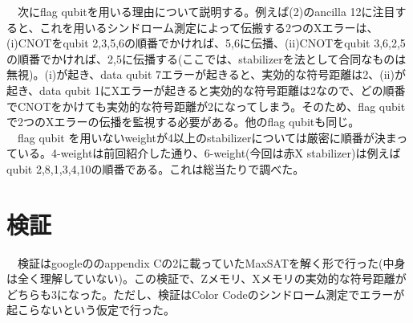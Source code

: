 \documentclass[a4paper,10pt]{ltjsarticle}
\begin{document}
{    　次にflag qubitを用いる理由について説明する。例えば(2)のancilla 12に注目すると、これを用いるシンドローム測定によって伝搬する2つのXエラーは、(i)CNOTをqubit 2,3,5,6の順番でかければ、5,6に伝播、(ii)CNOTをqubit 3,6,2,5の順番でかければ、2,5に伝播する(ここでは、stabilizerを法として合同なものは無視)。(i)が起き、data qubit 7エラーが起きると、実効的な符号距離は2、(ii)が起き、data qubit 1にXエラーが起きると実効的な符号距離は2なので、どの順番でCNOTをかけても実効的な符号距離が2になってしまう。そのため、flag qubitで2つのXエラーの伝播を監視する必要がある。他のflag qubitも同じ。\\
    　flag qubit を用いないweightが4以上のstabilizerについては厳密に順番が決まっている。4-weightは前回紹介した通り、6-weight(今回は赤X stabilizer)は例えばqubit 2,8,1,3,4,10の順番である。これは総当たりで調べた。
}

\section{検証}{
    　検証はgoogleの\cite{lacroix2024}のappendix Cの2に載っていたMaxSATを解く形で行った(中身は全く理解していない)。この検証で、Zメモリ、Xメモリの実効的な符号距離がどちらも3になった。ただし、検証はColor Codeのシンドローム測定でエラーが起こらないという仮定で行った。
}

\printbibliography
\end{document}

